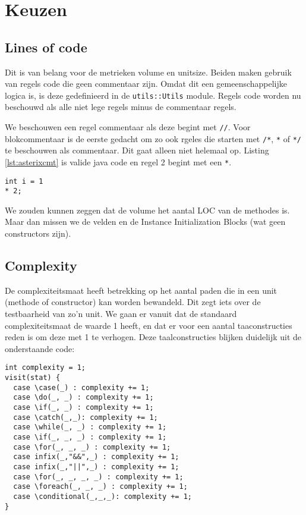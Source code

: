 \documentclass[a4paper]{article}
\begin{document}
\section{Keuzen}
\subsection{Lines of code}
Dit is van belang voor de metrieken volume en unitsize. Beiden maken gebruik van regels code die geen commentaar zijn. Omdat dit een gemeenschappelijke logica is, is deze gedefinieerd in de \texttt{utils::Utils} module.
Regels code worden nu beschouwd als alle niet lege regels minus de commentaar regels.

We beschouwen een regel commentaar als deze begint met \lstinline{//}. Voor blokcommentaar is de eerste gedacht om zo ook rgeles die starten met \lstinline{/*}, \lstinline{*} of \lstinline{*/} te beschouwen als commentaar. Dit gaat alleen niet helemaal op. Listing \ref{lst:asterixcmt} is valide java code en regel 2 begint met een \lstinline{*}.

\begin{lstlisting}[caption={* als commentaar beschouwen},label={lst:asterixcmt},escapechar=|, frame = single]
int i = 1
* 2;
\end{lstlisting}

We zouden kunnen zeggen dat de volume het aantal LOC van de methodes is. Maar dan missen we de velden en de Instance Initialization Blocks (wat geen constructors zijn).

\subsection{Complexity}
De complexiteitsmaat heeft betrekking op het aantal paden die in een unit (methode of constructor) kan worden bewandeld. Dit zegt iets over de testbaarheid van zo'n unit. We gaan er vanuit dat de standaard complexiteitsmaat de waarde 1 heeft, en dat er voor een aantal taaconstructies reden is om deze met 1 te verhogen. Deze taalconstructies blijken duidelijk uit de onderstaande code:

\begin{lstlisting}[caption={Taalsconstructies die de complexiteit verhogen},label={lst:complexity},escapechar=|, frame = single]
int complexity = 1;
visit(stat) {
  case \case(_) : complexity += 1;
  case \do(_, _) : complexity += 1;
  case \if(_, _) : complexity += 1;
  case \catch(_,_): complexity += 1;
  case \while(_, _) : complexity += 1;
  case \if(_, _, _) : complexity += 1;
  case \for(_, _, _) : complexity += 1;
  case infix(_,"&&",_) : complexity += 1;
  case infix(_,"||",_) : complexity += 1;    
  case \for(_, _, _, _) : complexity += 1;
  case \foreach(_, _, _) : complexity += 1;
  case \conditional(_,_,_): complexity += 1;
}
\end{lstlisting}
\end{document}

